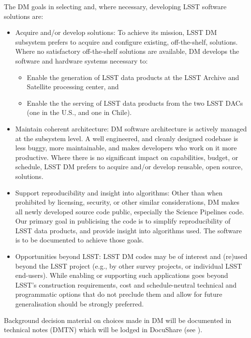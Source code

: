The DM goals in selecting and, where necessary, developing LSST software solutions are:

\begin{itemize}
	\item Acquire and/or develop solutions: To achieve its mission, LSST DM subsystem prefers to acquire and configure existing, off-the-shelf, solutions. Where no satisfactory off-the-shelf solutions are available, DM develops the software and hardware systems necessary to:
\begin{itemize}
	\item Enable the generation of LSST data products at the LSST Archive and Satellite processing center, and
	\item Enable the the serving of LSST data products from the two LSST DACs (one in the U.S., and one in Chile).
\end{itemize}
	\item Maintain coherent architecture: DM software architecture is actively managed at the subsystem level. A well engineered, and cleanly designed codebase is less buggy, more maintainable, and makes developers who work on it more productive. Where there is no significant impact on capabilities, budget, or schedule, LSST DM prefers to acquire and/or develop reusable, open source, solutions.
	\item Support reproducibility and insight into algorithms: Other than when prohibited by licensing, security, or other similar considerations, DM makes all newly developed source code public, especially the Science Pipelines code. Our primary goal in publicising the code is to simplify reproducibility of LSST data products, and provide insight into algorithms used. The software is to be documented to achieve those goals. 
	\item Opportunities beyond LSST: LSST DM codes may be of interest and (re)used beyond the LSST project (e.g., by other survey projects, or individual LSST end-users). While enabling or supporting such applications goes beyond LSST’s construction requirements, cost and schedule-neutral technical and programmatic options that do not preclude them and allow for future generalisation should be strongly preferred.


\end{itemize}

Background decision material on choices made in DM will be documented in technical notes (DMTN) which will be lodged in DocuShare (see ).
